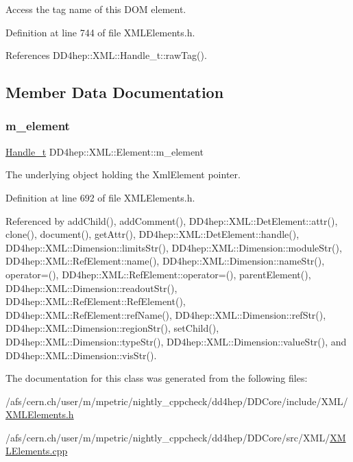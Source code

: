 Access the tag name of this D\+OM element. 



Definition at line 744 of file X\+M\+L\+Elements.\+h.



References D\+D4hep\+::\+X\+M\+L\+::\+Handle\+\_\+t\+::raw\+Tag().



\subsection{Member Data Documentation}
\hypertarget{class_d_d4hep_1_1_x_m_l_1_1_element_aa79a832ef142a29be556a3ec21c4e36d}{}\label{class_d_d4hep_1_1_x_m_l_1_1_element_aa79a832ef142a29be556a3ec21c4e36d} 
\subsubsection{\texorpdfstring{m\+\_\+element}{m\_element}}
{\footnotesize\ttfamily \hyperlink{class_d_d4hep_1_1_x_m_l_1_1_handle__t}{Handle\+\_\+t} D\+D4hep\+::\+X\+M\+L\+::\+Element\+::m\+\_\+element}



The underlying object holding the Xml\+Element pointer. 



Definition at line 692 of file X\+M\+L\+Elements.\+h.



Referenced by add\+Child(), add\+Comment(), D\+D4hep\+::\+X\+M\+L\+::\+Det\+Element\+::attr(), clone(), document(), get\+Attr(), D\+D4hep\+::\+X\+M\+L\+::\+Det\+Element\+::handle(), D\+D4hep\+::\+X\+M\+L\+::\+Dimension\+::limits\+Str(), D\+D4hep\+::\+X\+M\+L\+::\+Dimension\+::module\+Str(), D\+D4hep\+::\+X\+M\+L\+::\+Ref\+Element\+::name(), D\+D4hep\+::\+X\+M\+L\+::\+Dimension\+::name\+Str(), operator=(), D\+D4hep\+::\+X\+M\+L\+::\+Ref\+Element\+::operator=(), parent\+Element(), D\+D4hep\+::\+X\+M\+L\+::\+Dimension\+::readout\+Str(), D\+D4hep\+::\+X\+M\+L\+::\+Ref\+Element\+::\+Ref\+Element(), D\+D4hep\+::\+X\+M\+L\+::\+Ref\+Element\+::ref\+Name(), D\+D4hep\+::\+X\+M\+L\+::\+Dimension\+::ref\+Str(), D\+D4hep\+::\+X\+M\+L\+::\+Dimension\+::region\+Str(), set\+Child(), D\+D4hep\+::\+X\+M\+L\+::\+Dimension\+::type\+Str(), D\+D4hep\+::\+X\+M\+L\+::\+Dimension\+::value\+Str(), and D\+D4hep\+::\+X\+M\+L\+::\+Dimension\+::vis\+Str().



The documentation for this class was generated from the following files\+:\begin{DoxyCompactItemize}
\item 
/afs/cern.\+ch/user/m/mpetric/nightly\+\_\+cppcheck/dd4hep/\+D\+D\+Core/include/\+X\+M\+L/\hyperlink{_x_m_l_elements_8h}{X\+M\+L\+Elements.\+h}\item 
/afs/cern.\+ch/user/m/mpetric/nightly\+\_\+cppcheck/dd4hep/\+D\+D\+Core/src/\+X\+M\+L/\hyperlink{_x_m_l_elements_8cpp}{X\+M\+L\+Elements.\+cpp}\end{DoxyCompactItemize}
